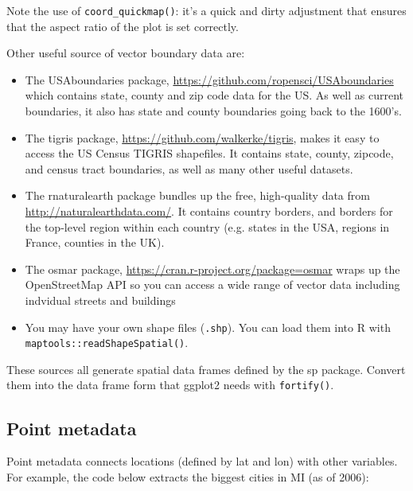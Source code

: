 Note the use of \texttt{coord\_quickmap()}: it's a quick and dirty
adjustment that ensures that the aspect ratio of the plot is set
correctly.

Other useful source of vector boundary data are:

\begin{itemize}
\item
  The USAboundaries package,
  \url{https://github.com/ropensci/USAboundaries} which contains state,
  county and zip code data for the US. As well as current boundaries, it
  also has state and county boundaries going back to the 1600's.
\item
  The tigris package, \url{https://github.com/walkerke/tigris}, makes it
  easy to access the US Census TIGRIS shapefiles. It contains state,
  county, zipcode, and census tract boundaries, as well as many other
  useful datasets.
\item
  The rnaturalearth package bundles up the free, high-quality data from
  \url{http://naturalearthdata.com/}. It contains country borders, and
  borders for the top-level region within each country (e.g. states in
  the USA, regions in France, counties in the UK).
\item
  The osmar package, \url{https://cran.r-project.org/package=osmar}
  wraps up the OpenStreetMap API so you can access a wide range of
  vector data including indvidual streets and buildings
\item
  You may have your own shape files (\texttt{.shp}). You can load them
  into R with \texttt{maptools::readShapeSpatial()}.
\end{itemize}

These sources all generate spatial data frames defined by the sp
package. Convert them into the data frame form that ggplot2 needs with
\texttt{fortify()}.

\subsection{Point metadata}

Point metadata connects locations (defined by lat and lon) with other
variables. For example, the code below extracts the biggest cities in MI
(as of 2006):


